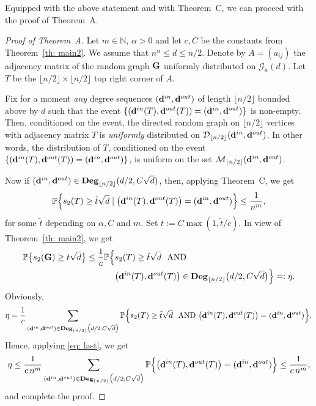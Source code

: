 \documentclass[12pt]{article}
\theoremstyle{definition}
\theoremstyle{plain}
\newcommand{\degreeset}{{\rm \bf Deg}}
\newcommand{\N}{\mathbb{N}}
\def\rangr{{\bf{}G}}
\def\Prob{{\mathbb P}}
\def\InDeg{{\bf d}^{in}}
\def\OutDeg{{\bf d}^{out}}
\def\UGraphSet{{\mathcal G}_{n}}
\begin{document}
\medskip

Equipped with the above statement and with Theorem~C, we can proceed with the proof of Theorem~A. 
\begin{proof}[Proof of Theorem~A]
Let $m\in \N$, $\alpha>0$ and let $c, C$ be the constants from Theorem~\ref{th: main2}.
We assume that $n^\alpha\leq d\leq n/2$. 
Denote by $A=(a_{ij})$ the adjacency matrix of the random graph $\rangr$ uniformly distributed on 
$\UGraphSet(d)$.
Let $T$ be the $\lfloor n/2\rfloor\times \lfloor n/2\rfloor$ 
top right corner of $A$. 

Fix for a moment {\it any} degree sequences $(\InDeg,\OutDeg)$ of length $\lfloor n/2\rfloor$ bounded above by $d$
such that the event $\{(\InDeg(T),\OutDeg(T))=(\InDeg,\OutDeg)\}$ is non-empty. 
Then, conditioned on the event, the directed random graph on $\lfloor n/2\rfloor$ vertices with adjacency matrix $T$
is {\it uniformly} distributed on ${\mathcal D}_{\lfloor n/2\rfloor}(\InDeg,\OutDeg)$. In other words,
the distribution of $T$, conditioned on the event $\{(\InDeg(T),\OutDeg(T))=(\InDeg,\OutDeg)\}$,
is uniform on the set ${\mathcal M}_{\lfloor n/2\rfloor}(\InDeg,\OutDeg)$.

Now if $(\InDeg,\OutDeg)\in \degreeset_{\lfloor n/2\rfloor}(d/2, C\sqrt{d})$,
then, applying Theorem~C, we get
\begin{equation}\label{eq: last}
\Prob\Big\{s_2(T)\geq \tilde t\sqrt{d}\mid \big(\InDeg(T),\OutDeg(T)\big)=(\InDeg,\OutDeg)\Big\}\leq \frac{1}{n^m},
\end{equation}
for some $\tilde t$ depending on $\alpha, C$ and $m$. 
Set $t:=C\max(1, \tilde t/c)$. In view of Theorem~\ref{th: main2}, we get
\begin{align*}
\Prob\big\{s_2(\rangr)\geq t \sqrt{d} \big\}\leq \frac{1}{c}\Prob\Big\{ &s_2(T)\geq \tilde t \sqrt{d} \mbox{ \ AND }\\
& \big(\InDeg(T),\OutDeg(T)\big)\in \degreeset_{\lfloor n/2\rfloor}\big(d/2, C\sqrt{d}\big)\Big\}=:\eta.
\end{align*}
Obviously,
$$
\eta=\frac{1}{c} \sum_{(\InDeg,\OutDeg)\in \degreeset_{\lfloor n/2\rfloor}\big(d/2, C\sqrt{d}\big)}
\Prob\Big\{ s_2(T)\geq \tilde t \sqrt{d} \mbox{ \ AND }\big(\InDeg(T),\OutDeg(T)\big)=(\InDeg,\OutDeg)\Big\}.
$$
Hence, applying \eqref{eq: last}, we get 
\begin{align*}
\eta&\leq \frac{1}{c\, n^m}\sum_{(\InDeg,\OutDeg)\in \degreeset_{\lfloor n/2\rfloor}\big(d/2, C\sqrt{d}\big)} 
\Prob\Big\{\big(\InDeg(T),\OutDeg(T)\big)=(\InDeg,\OutDeg)\Big\}\leq \frac{1}{c\, n^m},\\
\end{align*}
and complete the proof.
\end{proof}
\end{document}
